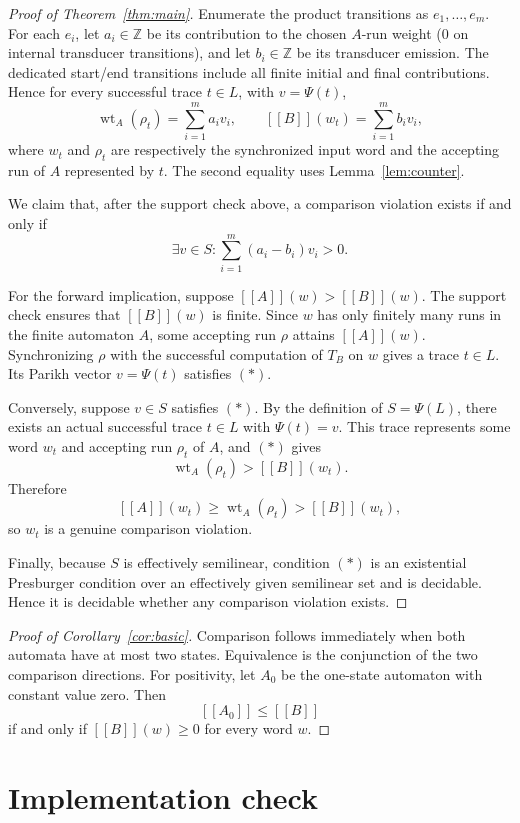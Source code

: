 \documentclass[11pt]{article}
\newcommand{\eval}[1]{[\![#1]\!]}
\begin{document}
\begin{proof}[Proof of Theorem~\ref{thm:main}]
Enumerate the product transitions as $e_1,\ldots,e_m$. For each $e_i$, let $a_i\in\mathbb Z$ be its contribution to the chosen $A$-run weight ($0$ on internal transducer transitions), and let $b_i\in\mathbb Z$ be its transducer emission. The dedicated start/end transitions include all finite initial and final contributions. Hence for every successful trace $t\in L$, with $v=\Psi(t)$,
\[
  \operatorname{wt}_A(\rho_t)=\sum_{i=1}^m a_i v_i,
  \qquad
  \eval{B}(w_t)=\sum_{i=1}^m b_i v_i,
\]
where $w_t$ and $\rho_t$ are respectively the synchronized input word and the accepting run of $A$ represented by $t$. The second equality uses Lemma~\ref{lem:counter}.

We claim that, after the support check above, a comparison violation exists if and only if
\[
  \exists v\in S:
  \sum_{i=1}^m (a_i-b_i)v_i>0. \tag{*}
\]

For the forward implication, suppose $\eval{A}(w)>\eval{B}(w)$. The support check ensures that $\eval{B}(w)$ is finite. Since $w$ has only finitely many runs in the finite automaton $A$, some accepting run $\rho$ attains $\eval{A}(w)$. Synchronizing $\rho$ with the successful computation of $T_B$ on $w$ gives a trace $t\in L$. Its Parikh vector $v=\Psi(t)$ satisfies $(*)$.

Conversely, suppose $v\in S$ satisfies $(*)$. By the definition of $S=\Psi(L)$, there exists an actual successful trace $t\in L$ with $\Psi(t)=v$. This trace represents some word $w_t$ and accepting run $\rho_t$ of $A$, and $(*)$ gives
\[
  \operatorname{wt}_A(\rho_t)>\eval{B}(w_t).
\]
Therefore
\[
  \eval{A}(w_t)\ge \operatorname{wt}_A(\rho_t)>\eval{B}(w_t),
\]
so $w_t$ is a genuine comparison violation.

Finally, because $S$ is effectively semilinear, condition $(*)$ is an existential Presburger condition over an effectively given semilinear set and is decidable. Hence it is decidable whether any comparison violation exists.
\end{proof}

\begin{proof}[Proof of Corollary~\ref{cor:basic}]
Comparison follows immediately when both automata have at most two states. Equivalence is the conjunction of the two comparison directions. For positivity, let $A_0$ be the one-state automaton with constant value zero. Then
\[
\eval{A_0}\leq\eval{B}
\]
if and only if $\eval{B}(w)\geq0$ for every word $w$.
\end{proof}

\section{Implementation check}
\end{document}
